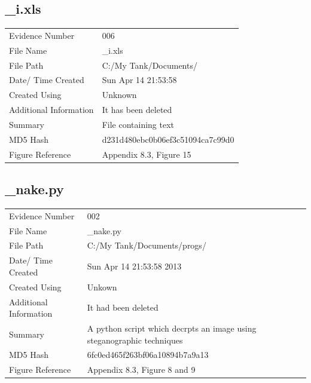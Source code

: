 \documentclass[12pt]{article}
\begin{document}
				\subsection{\_i.xls}
					\begin{tabular}{l | p{8cm}}
						Evidence Number & 006  \\
			    			File Name & \_i.xls \\
			      			File Path & C:/My Tank/Documents/ \\
						Date/ Time Created & Sun Apr 14 21:53:58 \\
						Created Using & Unknown \\
						Additional Information & It has been deleted \\
						Summary & File containing text \\
						MD5 Hash & d231d480ebc0b06ef3c51094ca7c99d0 \\
						Figure Reference & Appendix 8.3, Figure 15\\
					\end{tabular}

				\subsection{\_nake.py}
					\begin{tabular}{l | p{8cm}}
						Evidence Number & 002  \\
			    			File Name & \_nake.py  \\
			      			File Path & C:/My Tank/Documents/progs/  \\
						Date/ Time Created & Sun Apr 14 21:53:58 2013\\
						Created Using & Unkown\\
						Additional Information & It had been deleted\\
						Summary & A python script which decrpts an image using steganographic techniques\\
						MD5 Hash & 6fc0ed465f263bf06a10894b7a9a13\\
						Figure Reference & Appendix 8.3, Figure 8 and 9\\
					\end{tabular}
\end{document}
